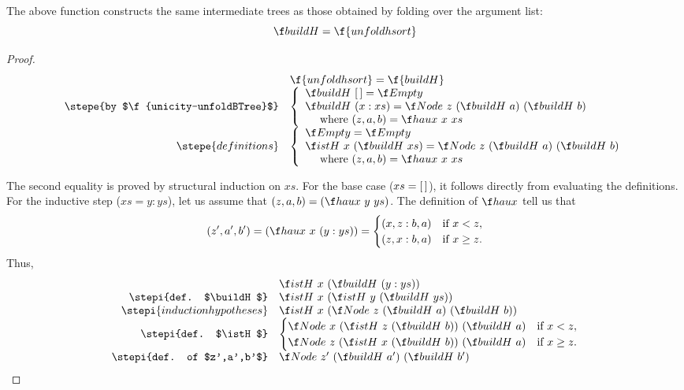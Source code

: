 \documentclass[a4paper,11pt]{llncs}
\begin{document}
\begin{proposition}
  \label{prop:buildH-unfold}
  The above function constructs the same intermediate trees as those
  obtained by folding over the argument list:
  $$
  \buildH = \f{unfoldhsort}
  $$
\end{proposition}
\begin{proof}
\[
  \begin{array}{rl}
    &\f{unfoldhsort} = \f{buildH}\\
    \stepe{by $\f{unicity-unfoldBTree}$}
    &
    \left \{
      \begin{array}[c]{l}
        \buildH\ \Nil = \Empty \\
        \buildH\ (x:xs) 
        = \Node\ z\ (\buildH\ a)\ (\buildH\ b) \\
        \quad\mbox{ where } (z,a,b) = \haux\ x\ xs
      \end{array}
    \right . \\
    \stepe{definitions}
    &
    \left \{
      \begin{array}[c]{l}
        \Empty = \Empty \\
        \istH\ x\ (\buildH\ xs) 
        = \Node\ z\ (\buildH\ a)\ (\buildH\ b) \\
        \quad\mbox{ where } (z,a,b) = \haux\ x\ xs
      \end{array}
    \right . 
  \end{array}
\]

The second equality is proved by structural induction on $xs$.
For the base case ($xs=[\,]$), it follows directly from evaluating the
definitions. For the inductive step ($xs=y:ys$),
let us assume that $(z,a,b)=(\haux\ y\ ys)$. The definition of $\haux$
tell us that
\[
(z',a',b') = (\haux\ x\ (y:ys)) =
\begin{cases}
(x,z:b,a) &\text{if $x<z$}, \\
(z,x:b,a) &\text{if $x\geq z$}.  
\end{cases}
\]
Thus,
\[
  \begin{array}{rl}
    & \istH\ x\ (\buildH\ (y:ys)) \\
    \stepi{def. $\buildH$}
    & \istH\ x\ (\istH\ y\ (\buildH\ ys)) \\
    \stepi{induction hypotheses}
    & \istH\ x\ (\Node\ z\ (\buildH\ a)\ (\buildH\ b)) \\
    \stepi{def. $\istH$}
    & \begin{cases}
      \Node\ x\ (\istH\ z\ (\buildH\ b))\ (\buildH\ a)
      &\text{if $x<z$}, \\
      \Node\ z\ (\istH\ x\ (\buildH\ b))\ (\buildH\ a)
      &\text{if $x\geq z$}. \\
      \end{cases}\\
    \stepi{def. of $z',a',b'$}
    &\Node\ z'\ (\buildH\ a')\ (\buildH\ b')
 \end{array}
\]
\end{proof}
\end{document}
